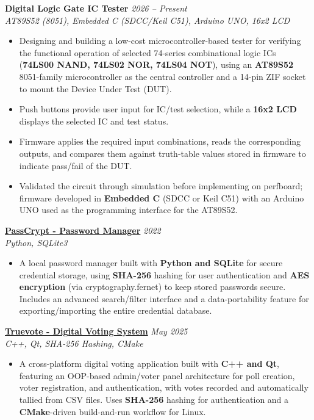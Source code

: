 \documentclass[a4paper]{article}
\begin{document}
\textbf{Digital Logic Gate IC Tester} \hfill \textit{2026 -- Present}\\
{\sl AT89S52 (8051), Embedded C (SDCC/Keil C51), Arduino UNO, 16x2 LCD}
\begin{itemize} \itemsep 1pt
    \item Designing and building a low-cost microcontroller-based tester for verifying the functional operation of selected 74-series combinational logic ICs (\textbf{74LS00 NAND, 74LS02 NOR, 74LS04 NOT}), using an \textbf{AT89S52} 8051-family microcontroller as the central controller and a 14-pin ZIF socket to mount the Device Under Test (DUT).
    \item Push buttons provide user input for IC/test selection, while a \textbf{16x2 LCD} displays the selected IC and test status.
    \item Firmware applies the required input combinations, reads the corresponding outputs, and compares them against truth-table values stored in firmware to indicate pass/fail of the DUT.
    \item Validated the circuit through simulation before implementing on perfboard; firmware developed in \textbf{Embedded C} (SDCC or Keil C51) with an Arduino UNO used as the programming interface for the AT89S52.
\end{itemize}
\vspace*{2mm}

\href{https://github.com/aaromalonline/PassCrypt}{\textbf{PassCrypt - Password Manager}} \hfill \textit{2022}\\
{\sl Python, SQLite3}
\begin{itemize}
    \item[] A local password manager built with \textbf{Python and SQLite} for secure credential storage, using \textbf{SHA-256} hashing for user authentication and \textbf{AES encryption} (via cryptography.fernet) to keep stored passwords secure. Includes an advanced search/filter interface and a data-portability feature for exporting/importing the entire credential database.
\end{itemize}
\vspace*{2mm}

\href{https://github.com/aaromalonline/truevote}{\textbf{Truevote - Digital Voting System}} \hfill \textit{May 2025}\\
{\sl C++, Qt, SHA-256 Hashing, CMake}
\begin{itemize}
    \item[] A cross-platform digital voting application built with \textbf{C++ and Qt}, featuring an OOP-based admin/voter panel architecture for poll creation, voter registration, and authentication, with votes recorded and automatically tallied from CSV files. Uses \textbf{SHA-256} hashing for authentication and a \textbf{CMake}-driven build-and-run workflow for Linux.
\end{itemize}
\vspace{10pt}
\end{document}
